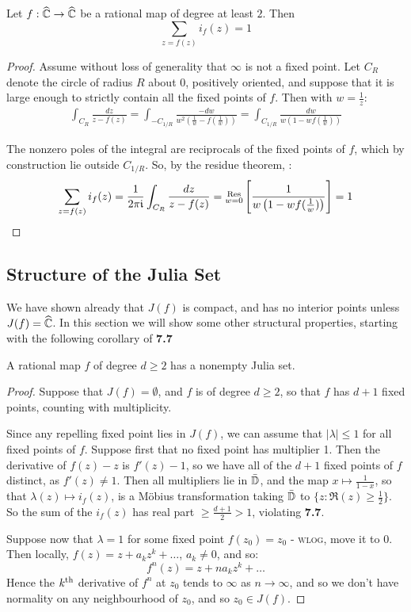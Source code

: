 \documentclass[10pt,a4paper]{article}
\begin{document}
\begin{theorem}
  Let $f:\widehat{\mathbb{C}} \to \widehat{\mathbb{C}}$ be a rational map of degree at least $2$. Then
  \[ \sum_{z=f(z)} i_f(z) = 1\]
\end{theorem}
\begin{proof}
  Assume without loss of generality that $\infty$ is not a fixed point. Let $C_R$ denote the circle of radius $R$ about $0$, positively oriented, and suppose that it is large enough to strictly contain all the fixed points of $f$. Then with $w = \frac{1}{z}$:
  \begin{align*}
    \int_{C_R} \frac{dz}{z-f(z)} = \int_{-C_{1/R}}\frac{-dw}{w^2\left(\frac{1}{w}-f(\frac{1}{w})\right)} = \int_{C_{1/R}}\frac{dw}{w\left(1-wf(\frac{1}{w})\right)}
  \end{align*}

  The nonzero poles of the integral are reciprocals of the fixed points of $f$, which by construction lie outside $C_{1/R}$. So, by the residue theorem, :
  \begin{align*}
    \sum_{z=f(z)}i_f(z) = \frac{1}{2\pi\mathfrak{i}}\int_{C_R}\frac{dz}{z-f(z)} = \substack{\text{Res}\\w=0}\left[\frac{1}{w\left(1-wf(\frac{1}{w})\right)}\right] = 1
  \end{align*}
\end{proof}
\subsection{Structure of the Julia Set}
We have shown already that $J(f)$ is compact, and has no interior points unless $J(f) = \widehat{\mathbb{C}}$. In this section we will show some other structural properties, starting with the following corollary of \textbf{7.7}
\begin{corollary}
  A rational map $f$ of degree $d \geq 2$ has a nonempty Julia set.
\end{corollary}
\begin{proof}
  Suppose that $J(f)=\emptyset$, and $f$ is of degree $d\geq 2$, so that $f$ has $d+1$ fixed points, counting with multiplicity.

  Since any repelling fixed point lies in $J(f)$, we can assume that $|\lambda| \leq 1$ for all fixed points of $f$. Suppose first that no fixed point has multiplier 1. Then the derivative of $f(z)-z$ is $f'(z)-1$, so we have all of the $d+1$ fixed points of $f$ distinct, as $f'(z)\neq 1$. Then all multipliers lie in $\bar{\mathbb{D}}$, and the map $x \mapsto \frac{1}{1-x}$, so that $\lambda(z) \mapsto i_f(z)$, is a M\"obius transformation taking $\bar{\mathbb{D}}$ to $\{z : \Re(z) \geq \frac{1}{2}\}$. So the sum of the $i_f(z)$ has real part $\geq \frac{d+1}{2} > 1$, violating \textbf{7.7}.

  Suppose now that $\lambda = 1$ for some fixed point $f(z_0) = z_0$ - \textsc{wlog}, move it to 0. Then locally, $f(z) = z + a_kz^k + \ldots$, $a_k \neq 0$, and so:
  \[f^n(z) = z+na_k z^k + \ldots\]
  Hence the $k\textsuperscript{th}$ derivative of $f^n$ at $z_0$ tends to $\infty$ as $n \to \infty$, and so we don't have normality on any neighbourhood of $z_0$, and so $z_0 \in J(f)$.
\end{proof}
\end{document}

